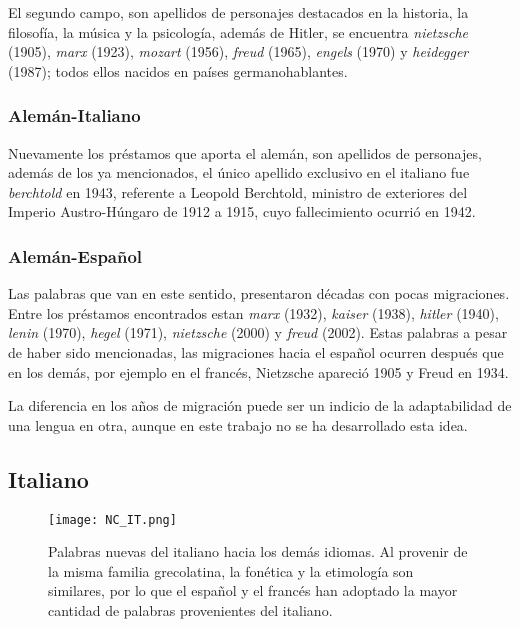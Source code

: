 El segundo campo, son apellidos de  personajes destacados en la historia, la filosofía, la música y la psicología, además de Hitler, se encuentra  \textit{nietzsche} (1905),  \textit{marx} (1923),  \textit{mozart} (1956), \textit{freud} (1965), \textit{engels} (1970) y \textit{heidegger} (1987); todos ellos  nacidos en países germanohablantes.

\subsubsection*{Alemán-Italiano}%

Nuevamente los préstamos que aporta el alemán,  son apellidos de personajes,  además de los ya mencionados, el único apellido exclusivo en el italiano fue \textit{berchtold} en 1943, referente a Leopold Berchtold, ministro de exteriores del Imperio Austro-Húngaro de 1912 a 1915, cuyo fallecimiento ocurrió en 1942.


  
\subsubsection*{Alemán-Español}%

Las palabras que van en este sentido,  presentaron  décadas  con pocas migraciones. Entre los préstamos encontrados estan \textit{marx} (1932), \textit{kaiser} (1938), \textit{hitler} (1940), \textit{lenin} (1970), \textit{hegel} (1971),  \textit{nietzsche} (2000) y \textit{freud} (2002). Estas palabras a pesar de haber sido mencionadas,  las migraciones hacia el español ocurren después que en los demás, por ejemplo en el francés,  Nietzsche apareció 1905 y Freud en 1934. 

La diferencia en los años de migración puede ser un indicio de la adaptabilidad de una lengua en otra, aunque en este trabajo no se ha desarrollado esta idea. 



\subsection{Italiano}%

\begin{figure}
	\centering
	\texttt{[image: NC\_IT.png]}
	\label{fig.NC_IT}
	\caption{Palabras nuevas del italiano hacia los demás idiomas. Al provenir de la misma familia grecolatina, la fonética y la etimología son similares, por lo que  el español y el francés han adoptado la mayor cantidad de palabras provenientes del italiano.} 
\end{figure}





